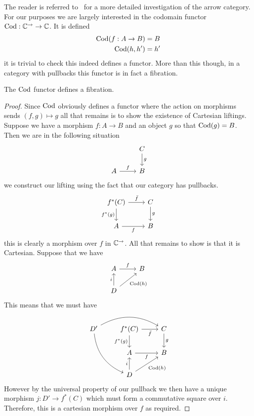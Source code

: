 The reader is referred to~\citet{MacLane:98} for a more detailed
investigation of the arrow category. For our purposes we are largely
interested in the codomain functor $\operatorname{Cod} : \mathbb{C}^{\to} \to
\mathbb{C}$. It is defined
\begin{align*}
  \operatorname{Cod}(f : A \to B) &= B\\
  \operatorname{Cod}(h, h') &= h'
\end{align*}
it is trivial to check this indeed defines a functor. More than this
though, in a category with pullbacks this functor is in fact a
fibration.
\begin{example}\label{example:fibrations:cod}
  The $\operatorname{Cod}$ functor defines a fibration.
\end{example}
\begin{proof}
  Since $\operatorname{Cod}$ obviously defines a functor where the action on
  morphisms sends $(f, g) \mapsto g$ all that remains is to show the
  existence of Cartesian liftings. Suppose we have a morphism $f : A
  \to B$ and an object $g$ so that $\operatorname{Cod}(g) = B$. Then we are in the
  following situation
  \[
    \begin{tikzcd}
      & C \ar[d, "g"]\\
      A \ar[r, "f"] & B
    \end{tikzcd}
  \]
  we construct our lifting using the fact that our category has
  pullbacks.
  \[
    \begin{tikzcd}
      f^*(C) \ar[d, "f^*(g)", swap] \ar[r, "\bar{f}"] & C \ar[d, "g"]\\
      A \ar[r, "f", swap] & B
    \end{tikzcd}
  \]
  this is clearly a morphism over $f$ in $\mathbb{C}^{\to}$. All that
  remains to show is that it is Cartesian. Suppose that we have
  \[
    \begin{tikzcd}
      A \ar[r, "f"] & B\\
      D \ar[u, "i"] \ar[ru, "\cod(h)", swap] &
    \end{tikzcd}
  \]
  This means that we must have
  \[
    \begin{tikzcd}
      D' \ar[rr, bend left] \ar[ddr, bend right] &
      f^*(C) \ar[d, "f^*(g)", swap] \ar[r, swap, "\bar{f}"] & C \ar[d, "g"]\\
      & A \ar[r, "f", swap] & B\\
      & D \ar[u, "i"] \ar[ru, "\cod(h)", swap] &
    \end{tikzcd}
  \]
  However by the universal property of our pullback we then have a
  unique morphism $j : D' \to f^*(C)$ which must form a commutative
  square over $i$. Therefore, this is a cartesian morphism over $f$ as
  required.
\end{proof}

